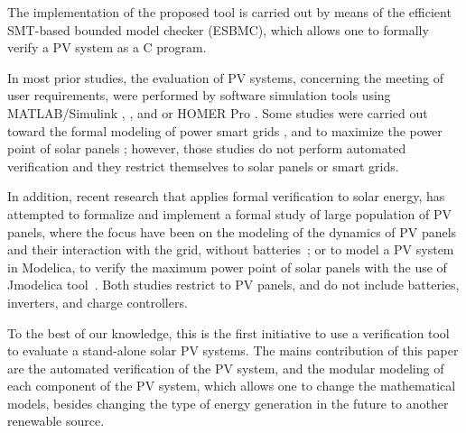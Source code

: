 \documentclass[journal]{IEEEtran}
\begin{document}
The implementation of the proposed tool is carried out by means of the efficient SMT-based bounded model checker (ESBMC), which allows one to formally verify a PV system as a C program.

In most prior studies, the evaluation of PV systems, concerning the meeting of user requirements, were performed by software simulation tools using MATLAB/Simulink \cite{Benatiallah2017}, \cite{Samrat2014}, and \cite{Natsheh2012} or HOMER Pro \cite{Lamnadi2017}. Some studies were carried out toward the formal modeling of power smart grids \cite{Akram2018}, and to maximize the power point of solar panels \cite{Driouich2017}; however, those studies do not perform automated verification and they restrict themselves to solar panels or smart grids. 

In addition, recent research that applies formal verification to solar energy, has attempted to formalize and implement a formal study of large population of PV panels, where the focus have been on the modeling of the dynamics of PV panels and their interaction with the grid, without batteries~\cite{Abate2017}; or to model a PV system in Modelica, to verify the maximum power point of solar panels with the use of Jmodelica tool~\cite{Driouich2018}. Both studies restrict to PV panels, and do not include batteries, inverters, and charge controllers.
  
To the best of our knowledge, this is the first initiative to use a verification tool to evaluate a stand-alone solar PV systems. %
The mains contribution of this paper are the automated verification of the PV system, and the modular modeling of each component of the PV system, which allows one to change the mathematical models, besides changing the type of energy generation in the future to another renewable source.

%
 
\end{document}
